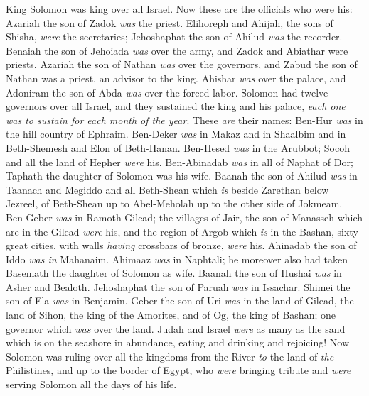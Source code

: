 \begin{biblechapter} %
 King Solomon was king over all Israel.
\verse Now these are the officials who were his: Azariah the son of Zadok \textit{was} the priest.
\verse Elihoreph and Ahijah, the sons of Shisha, \textit{were} the secretaries; Jehoshaphat the son of Ahilud \textit{was} the recorder.
\verse Benaiah the son of Jehoiada \textit{was} over the army, and Zadok and Abiathar were priests.
\verse Azariah the son of Nathan \textit{was} over the governors, and Zabud the son of Nathan was a priest, an advisor to the king.
\verse Ahishar \textit{was} over the palace, and Adoniram the son of Abda \textit{was} over the forced labor.
\verse Solomon had twelve governors over all Israel, and they sustained the king and his palace, \textit{each one was to sustain for each month of the year}.
\verse These \textit{are} their names: Ben-Hur \textit{was} in the hill country of Ephraim.
\verse Ben-Deker \textit{was} in Makaz and in Shaalbim and in Beth-Shemesh and Elon of Beth-Hanan.
\verse Ben-Hesed \textit{was} in the Arubbot; Socoh and all the land of Hepher \textit{were} his.
\verse Ben-Abinadab \textit{was} in all of Naphat of Dor; Taphath the daughter of Solomon was his wife.
\verse Baanah the son of Ahilud \textit{was} in Taanach and Megiddo and all Beth-Shean which \textit{is} beside Zarethan below Jezreel, of Beth-Shean up to Abel-Meholah up to the other side of Jokmeam.
\verse Ben-Geber \textit{was} in Ramoth-Gilead; the villages of Jair, the son of Manasseh which are in the Gilead \textit{were} his, and the region of Argob which \textit{is} in the Bashan, sixty great cities, with walls \textit{having} crossbars of bronze, \textit{were} his.
\verse Ahinadab the son of Iddo \textit{was in} Mahanaim.
\verse Ahimaaz \textit{was} in Naphtali; he moreover also had taken Basemath the daughter of Solomon as wife.
\verse Baanah the son of Hushai \textit{was} in Asher and Bealoth.
\verse Jehoshaphat the son of Paruah \textit{was} in Issachar.
\verse Shimei the son of Ela \textit{was} in Benjamin.
\verse Geber the son of Uri \textit{was} in the land of Gilead, the land of Sihon, the king of the Amorites, and of Og, the king of Bashan; one governor which \textit{was} over the land.
\verse Judah and Israel \textit{were} as many as the sand which is on the seashore in abundance, eating and drinking and rejoicing!
  Now Solomon was ruling over all the kingdoms from the River \textit{to} the land of \textit{the} Philistines, and up to the border of Egypt, who \textit{were} bringing tribute and \textit{were} serving Solomon all the days of his life.

\end{biblechapter}
